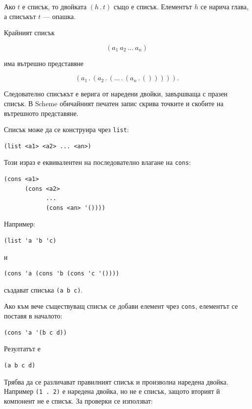 \begin{defn}
Ако $t$ е списък, то двойката $(h \mathbin{.} t)$ също е списък. Елементът $h$ се нарича глава, а списъкът $t$ --- опашка.
\end{defn}

Крайният списък

\[
(a_1\ a_2\ \ldots\ a_n)
\]

има вътрешно представяне

\[
(a_1\mathbin{.}(a_2\mathbin{.}(\ldots
\mathbin{.}(a_n\mathbin{.}())))).
\]

Следователно списъкът е верига от наредени двойки, завършваща с празен списък. В Scheme обичайният печатен запис скрива точките и скобите на вътрешното представяне.

Списък може да се конструира чрез \texttt{list}:

\begin{verbatim}
(list <a1> <a2> ... <an>)
\end{verbatim}

Този израз е еквивалентен на последователно влагане на \texttt{cons}:

\begin{verbatim}
(cons <a1>
      (cons <a2>
            ...
            (cons <an> '())))
\end{verbatim}

Например:

\begin{verbatim}
(list 'a 'b 'c)
\end{verbatim}

и

\begin{verbatim}
(cons 'a (cons 'b (cons 'c '())))
\end{verbatim}

създават списъка \texttt{(a b c)}.

Ако към вече съществуващ списък се добави елемент чрез \texttt{cons}, елементът се поставя в началото:

\begin{verbatim}
(cons 'a '(b c d))
\end{verbatim}

Резултатът е

\begin{verbatim}
(a b c d)
\end{verbatim}

Трябва да се различават правилният списък и произволна наредена двойка. Например \texttt{(1 . 2)} е наредена двойка, но не е списък, защото вторият й компонент не е списък. За проверки се използват:

